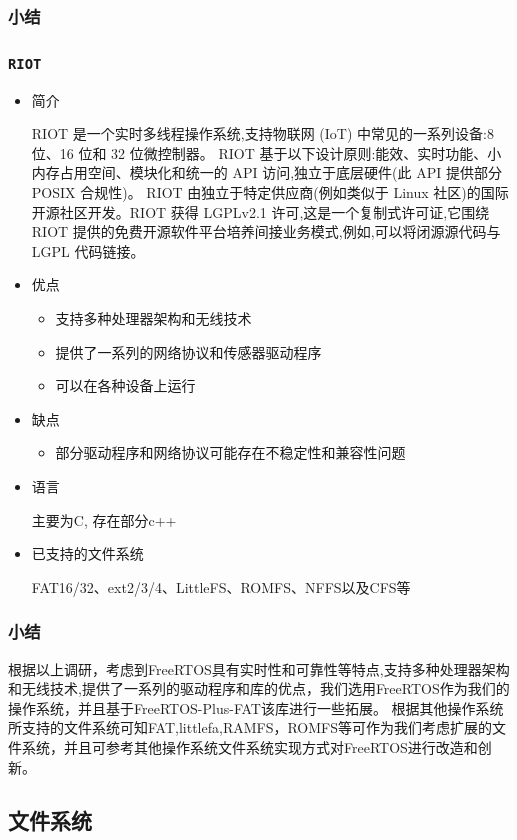 \documentclass[UTF8,a4paper]{ctexart}
\begin{document}
\subsubsection{小结}

\subsubsection{\texttt{RIOT}}
\begin{itemize}
\item 简介

RIOT 是一个实时多线程操作系统,支持物联网 (IoT) 中常见的一系列设备:8 位、16 位和 32 位微控制器。
RIOT 基于以下设计原则:能效、实时功能、小内存占用空间、模块化和统一的 API 访问,独立于底层硬件(此 API 提供部分 POSIX 合规性)。
RIOT 由独立于特定供应商(例如类似于 Linux 社区)的国际开源社区开发。RIOT 获得 LGPLv2.1 许可,这是一个复制式许可证,它围绕
RIOT 提供的免费开源软件平台培养间接业务模式,例如,可以将闭源源代码与 LGPL 代码链接。
\item 优点
\begin{itemize}
    \item 支持多种处理器架构和无线技术
    \item 提供了一系列的网络协议和传感器驱动程序
    \item 可以在各种设备上运行 
\end{itemize}
\item 缺点
\begin{itemize}
    \item 部分驱动程序和网络协议可能存在不稳定性和兼容性问题
\end{itemize}
\item 语言

主要为C, 存在部分c++
\item 已支持的文件系统

FAT16/32、ext2/3/4、LittleFS、ROMFS、NFFS以及CFS等
\end{itemize}
\subsubsection{小结}
根据以上调研，考虑到FreeRTOS具有实时性和可靠性等特点,支持多种处理器架构和无线技术,提供了一系列的驱动程序和库的优点，我们选用FreeRTOS作为我们的操作系统，并且基于FreeRTOS-Plus-FAT该库进行一些拓展。
根据其他操作系统所支持的文件系统可知FAT,littlefa,RAMFS，ROMFS等可作为我们考虑扩展的文件系统，并且可参考其他操作系统文件系统实现方式对FreeRTOS进行改造和创新。

\subsection{文件系统}
\end{document}

